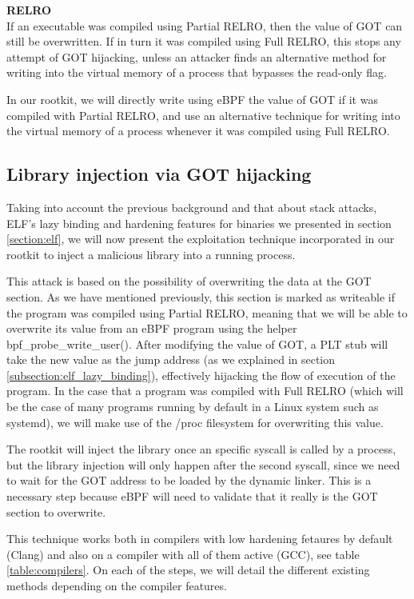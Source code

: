 \textbf{RELRO}\\
If an executable was compiled using Partial RELRO, then the value of GOT can still be overwritten. If in turn it was compiled using Full RELRO, this stops any attempt of GOT hijacking, unless an attacker finds an alternative method for writing into the virtual memory of a process that bypasses the read-only flag. 

In our rootkit, we will directly write using eBPF the value of GOT if it was compiled with Partial RELRO, and use an alternative technique for writing into the virtual memory of a process whenever it was compiled using Full RELRO.


\subsection{Library injection via GOT hijacking} \label{subsection:got_attack}
Taking into account the previous background and that about stack attacks, ELF's lazy binding and hardening features for binaries we presented in section \ref{section:elf}, we will now present the exploitation technique incorporated in our rootkit to inject a malicious library into a running process. 

This attack is based on the possibility of overwriting the data at the GOT section. As we have mentioned previously, this section is marked as writeable if the program was compiled using Partial RELRO, meaning that we will be able to overwrite its value from an eBPF program using the helper bpf\_probe\_write\_user(). After modifying the value of GOT, a PLT stub will take the new value as the jump address (as we explained in section \ref{subsection:elf_lazy_binding}), effectively hijacking the flow of execution of the program. In the case that a program was compiled with Full RELRO (which will be the case of many programs running by default in a Linux system such as systemd), we will make use of the /proc filesystem for overwriting this value.

The rootkit will inject the library once an specific syscall is called by a process, but the library injection will only happen after the second syscall, since we need to wait for the GOT address to be loaded by the dynamic linker. This is a necessary step because eBPF will need to validate that it really is the GOT section to overwrite.

This technique works both in compilers with low hardening fetaures by default (Clang) and also on a compiler with all of them active (GCC), see table \ref{table:compilers}. On each of the steps, we will detail the different existing methods depending on the compiler features.

